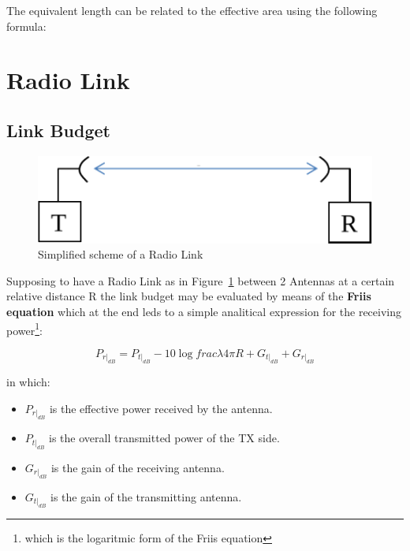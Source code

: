 The equivalent length can be related to the effective area using the following formula:








\section{Radio Link} %
\label{sec:radio_link}


\subsection{Link Budget} %
\label{sub:link_budget}

\begin{figure}[h]
	\centering
	\includegraphics[scale=0.6]{Immagini/link}
	
	\caption{Simplified scheme of a Radio Link}
	\label{fig:link}
\end{figure}

Supposing to have a Radio Link as in Figure~\ref{fig:link} between 2 Antennas at a certain relative distance R the link budget may be evaluated by means of the \textbf{Friis equation} which at the end leds to a simple analitical expression for the receiving power\footnote{which is the logaritmic form of the Friis equation}:

\begin{equation}	
P_{r|_{dB}} = P_{t|_{dB}} - 10 \log{frac{\lambda}{4\pi R}} + G_{t|_{dB}} + G_{r|_{dB}} 
\end{equation}

in which:

\begin{itemize}
	\item $P_{r|_{dB}}$ is the effective power received by the antenna.
	\item $P_{t|_{dB}}$ is the overall transmitted power of the TX side.
	\item $G_{r|_{dB}}$ is the gain of the receiving antenna.
	\item $G_{t|_{dB}}$ is the gain of the transmitting antenna.
\end{itemize}

